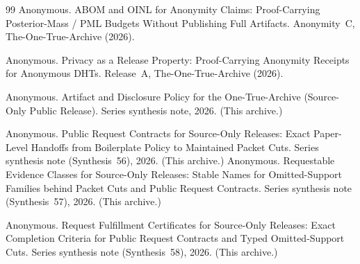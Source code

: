 \documentclass[11pt]{article}
\begin{document}
\begin{thebibliography}{99}
Anonymous.
\newblock ABOM and OINL for Anonymity Claims: Proof-Carrying Posterior-Mass / PML Budgets Without Publishing Full Artifacts.
\newblock Anonymity~C, The-One-True-Archive (2026).

Anonymous.
\newblock Privacy as a Release Property: Proof-Carrying Anonymity Receipts for Anonymous DHTs.
\newblock Release~A, The-One-True-Archive (2026).

Anonymous.
\newblock Artifact and Disclosure Policy for the One-True-Archive (Source-Only Public Release).
\newblock Series synthesis note, 2026. (This archive.)

Anonymous.
\newblock Public Request Contracts for Source-Only Releases: Exact Paper-Level Handoffs from Boilerplate Policy to Maintained Packet Cuts.
\newblock Series synthesis note (Synthesis~56), 2026. (This archive.)
Anonymous.
\newblock Requestable Evidence Classes for Source-Only Releases: Stable Names for Omitted-Support Families behind Packet Cuts and Public Request Contracts.
\newblock Series synthesis note (Synthesis~57), 2026. (This archive.)

Anonymous.
\newblock Request Fulfillment Certificates for Source-Only Releases: Exact Completion Criteria for Public Request Contracts and Typed Omitted-Support Cuts.
\newblock Series synthesis note (Synthesis~58), 2026. (This archive.)

\end{thebibliography}
\end{document}
